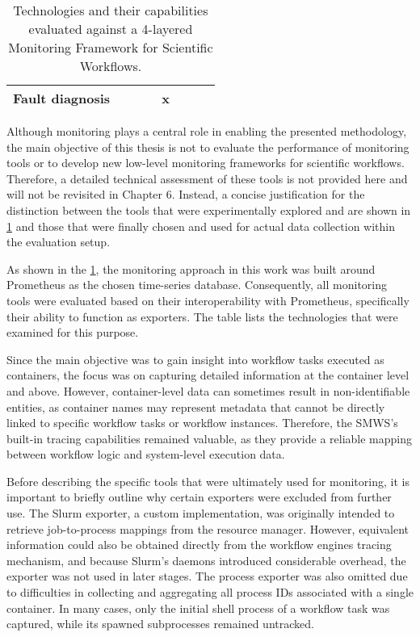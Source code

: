 \begin{table}[htbp]
{\begin{tabular}{lccccccc}
            Fault diagnosis                     &                   &                               &                          & x                   &                         &                           &                           \\
            \bottomrule
        \end{tabular}
    }
    \caption{Technologies and their capabilities evaluated against a 4-layered Monitoring Framework for Scientific Workflows.}
    \label{tab:monitoring-features}
\end{table}

Although monitoring plays a central role in enabling the presented methodology, the main objective of this thesis is not to evaluate the performance of monitoring tools or to develop new low-level monitoring frameworks for scientific workflows. Therefore, a detailed technical assessment of these tools is not provided here and will not be revisited in Chapter 6. Instead, a concise justification for the distinction between the tools that were experimentally explored and are shown in \ref{tab:monitoring-features} and those that were finally chosen and used for actual data collection within the evaluation setup.

As shown in the \ref{tab:monitoring-features}, the monitoring approach in this work was built around Prometheus as the chosen time-series database. Consequently, all monitoring tools were evaluated based on their interoperability with Prometheus, specifically their ability to function as exporters. The table lists the technologies that were examined for this purpose.

Since the main objective was to gain insight into workflow tasks executed as containers, the focus was on capturing detailed information at the container level and above. However, container-level data can sometimes result in non-identifiable entities, as container names may represent metadata that cannot be directly linked to specific workflow tasks or workflow instances. Therefore, the SMWS's built-in tracing capabilities remained valuable, as they provide a reliable mapping between workflow logic and system-level execution data.

Before describing the specific tools that were ultimately used for monitoring, it is important to briefly outline why certain exporters were excluded from further use. The Slurm exporter, a custom implementation, was originally intended to retrieve job-to-process mappings from the resource manager. However, equivalent information could also be obtained directly from the workflow engines tracing mechanism, and because Slurm's daemons introduced considerable overhead, the exporter was not used in later stages. The process exporter was also omitted due to difficulties in collecting and aggregating all process IDs associated with a single container. In many cases, only the initial shell process of a workflow task was captured, while its spawned subprocesses remained untracked.

